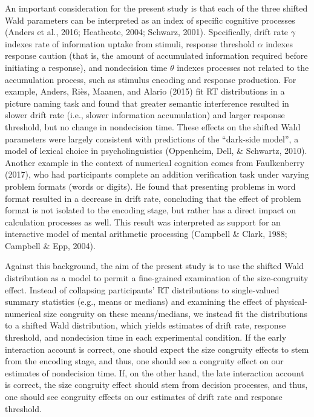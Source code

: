\documentclass[english,man]{apa6}
\theoremstyle{definition}
\theoremstyle{definition}
\theoremstyle{definition}
\theoremstyle{remark}
\begin{document}
An important consideration for the present study is that each of the
three shifted Wald parameters can be interpreted as an index of specific
cognitive processes (Anders et al., 2016; Heathcote, 2004; Schwarz,
2001). Specifically, drift rate \(\gamma\) indexes rate of information
uptake from stimuli, response threshold \(\alpha\) indexes response
caution (that is, the amount of accumulated information required before
initiating a response), and nondecision time \(\theta\) indexes
processes not related to the accumulation process, such as stimulus
encoding and response production. For example, Anders, Riès, Maanen, and
Alario (2015) fit RT distributions in a picture naming task and found
that greater semantic interference resulted in slower drift rate (i.e.,
slower information accumulation) and larger response threshold, but no
change in nondecision time. These effects on the shifted Wald parameters
were largely consistent with predictions of the \enquote{dark-side
model}, a model of lexical choice in psycholinguistics (Oppenheim, Dell,
\& Schwartz, 2010). Another example in the context of numerical
cognition comes from Faulkenberry (2017), who had participants complete
an addition verification task under varying problem formats (words or
digits). He found that presenting problems in word format resulted in a
decrease in drift rate, concluding that the effect of problem format is
not isolated to the encoding stage, but rather has a direct impact on
calculation processes as well. This result was interpreted as support
for an interactive model of mental arithmetic processing (Campbell \&
Clark, 1988; Campbell \& Epp, 2004).

Against this background, the aim of the present study is to use the
shifted Wald distribution as a model to permit a fine-grained
examination of the size-congruity effect. Instead of collapsing
participants' RT distributions to single-valued summary statistics
(e.g., means or medians) and examining the effect of physical-numerical
size congruity on these means/medians, we instead fit the distributions
to a shifted Wald distribution, which yields estimates of drift rate,
response threshold, and nondecision time in each experimental condition.
If the early interaction account is correct, one should expect the size
congruity effects to stem from the encoding stage, and thus, one should
see a congruity effect on our estimates of nondecision time. If, on the
other hand, the late interaction account is correct, the size congruity
effect should stem from decision processes, and thus, one should see
congruity effects on our estimates of drift rate and response threshold.
\end{document}
